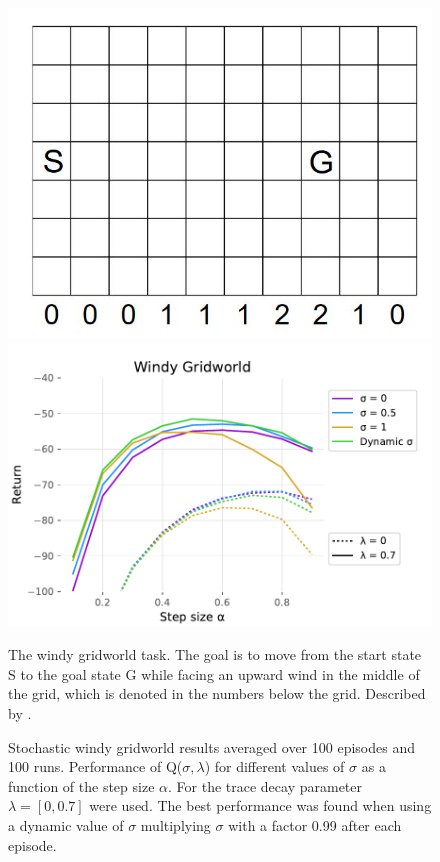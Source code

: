 \documentclass{article} %
\begin{document}
\begin{figure}
\centering
\begin{minipage}[b]{.35\textwidth}
  \includegraphics[width = \textwidth]{windy_gridworld}
\end{minipage} \hspace{0.5cm}
\begin{minipage}[b]{.6\textwidth}
  \includegraphics[width = \textwidth]{windygridworld_alpha.pdf}
\end{minipage}
\begin{minipage}[t]{.35\textwidth}
  \caption{The windy gridworld task. The goal is to move from the start state S to the goal state G while facing an upward wind in the middle of the grid, which is denoted in the numbers below the grid. Described by \cite{sutton1998}.}
  \label{fig:windy_gridworld}
\end{minipage}\hspace{0.5cm}
\begin{minipage}[t]{.6\textwidth}
  \caption{Stochastic windy gridworld results averaged over 100 episodes and 100 runs. Performance of Q($\sigma, \lambda$) for different values of $\sigma$ as a function of the step size $\alpha$. For the trace decay parameter $\lambda = [0, 0.7]$ were used. The best performance was found when using a dynamic value of $\sigma$ multiplying $\sigma$ with a factor 0.99 after each episode.}
  \label{fig:windygrid_results}
\end{minipage}
\end{figure}
\end{document}
